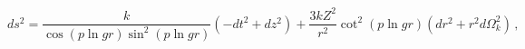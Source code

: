 \begin{equation}
ds^2 = \frac{k}{\cos(p\ln gr)\sin^2(p\ln gr)} (-dt^2 + dz^2) +
       \frac{3kZ^2}{r^2}\cot^2(p\ln gr)(dr^2 + r^2 d\Omega_k^2)\,, \label{finalmetr}
\end{equation}

